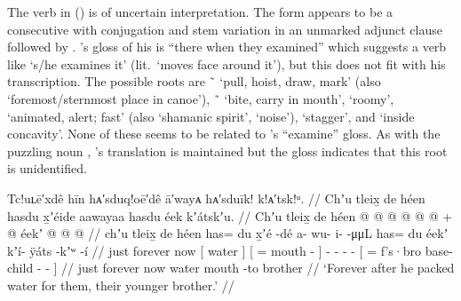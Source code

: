 The verb  in (\lastx) is of uncertain interpretation.
The form appears to be a consecutive with  conjugation and  stem variation in an unmarked adjunct clause followed by .
\citeauthor{swanton:1909}’s gloss of his  is “there when they examined” which suggests a verb like  ‘s/he examines it’ (lit.\ ‘moves face around it’), but this does not fit with his transcription.
The possible roots are  \~\  ‘pull, hoist, draw, mark’ (also  ‘foremost/sternmost place in canoe’),  \~\  ‘bite, carry in mouth’,  ‘roomy’,  ‘animated, alert; fast’ (also  ‘shamanic spirit’,  ‘noise’),  ‘stagger’, and  ‘inside concavity’.
None of these seems to be related to \citeauthor{swanton:1909}’s “examine” gloss.
As with the puzzling noun , \citeauthor{swanton:1909}’s translation is maintained but the gloss indicates that this root is unidentified.

\ex\label{ex:89-97-forever-pack-water}%
%
\begingl
	\glpreamble	Tc!uʟē′xdê hīn hᴀ′sduq!oē′dê ā′wayᴀ hᴀ′sduīk! k!ᴀ′tsk!ᵘ. //
	\glpreamble	Chʼu tleix̱ de héen hasdu x̱ʼéide aawayaa hasdu éek kʼátskʼu.  //
	\gla	Chʼu tleix̱ de {} héen {}
		{}  @ {}  @ {} {}
		 @ {} @ {} @ {} @ {} +
		{}  @ {} éekʼ  @ {} @ {} @ {} {} //
	\glb	chʼu tleix̱ de {} héen {}
		{} has= du x̱ʼé -dé {}
		a- wu- i-  -μμL
		 {} has= du éekʼ kʼí- ÿáts -kʼʷ -í {} //
	\glc	just forever now {}[ water {}]
		{}[ =  mouth - {}]
		- - -  -
		{}[ =  f’s·bro base- child - - {}] //
	\gld	just forever now {} water {}
		{}  {} mouth -to {}
		 {} {} {} {}
		{}  {} brother  {} {} {} {} //
	\glft	‘Forever after he packed water for them, their younger brother.’
		//
\endgl
\xe

